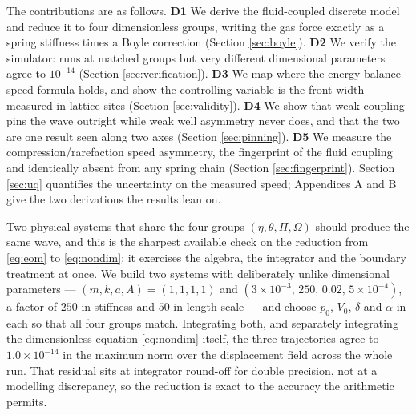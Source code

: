 The contributions are as follows. \textbf{D1} We derive the fluid-coupled discrete
model and reduce it to four dimensionless groups, writing the gas force exactly as
a spring stiffness times a Boyle correction (Section \ref{sec:boyle}).
\textbf{D2} We verify the simulator: runs at matched groups but very different
dimensional parameters agree to $10^{-14}$ (Section \ref{sec:verification}).
\textbf{D3} We map where the energy-balance speed formula holds, and show the
controlling variable is the front width measured in lattice sites (Section
\ref{sec:validity}). \textbf{D4} We show that weak coupling pins the wave outright
while weak well asymmetry never does, and that the two are one result seen along
two axes (Section \ref{sec:pinning}). \textbf{D5} We measure the
compression/rarefaction speed asymmetry, the fingerprint of the fluid coupling and
identically absent from any spring chain (Section \ref{sec:fingerprint}). Section
\ref{sec:uq} quantifies the uncertainty on the measured speed; Appendices A and B
give the two derivations the results lean on.



Two physical systems that share the four groups $(\eta,\theta,\Pi,\Omega)$ should
produce the same wave, and this is the sharpest available check on the reduction
from \eqref{eq:eom} to \eqref{eq:nondim}: it exercises the algebra, the
integrator and the boundary treatment at once. We build two systems with
deliberately unlike dimensional parameters --- $(m,k,a,A) = (1, 1, 1, 1)$ and
$(3\times10^{-3},\, 250,\, 0.02,\, 5\times10^{-4})$, a factor of $250$ in
stiffness and $50$ in length scale --- and choose $p_0$, $V_0$, $\delta$ and
$\alpha$ in each so that all four groups match. Integrating both, and separately
integrating the dimensionless equation \eqref{eq:nondim} itself, the three
trajectories agree to $1.0\times10^{-14}$ in the maximum norm over the displacement
field across the whole run. That residual sits at integrator round-off for double
precision, not at a modelling discrepancy, so the reduction is exact to the
accuracy the arithmetic permits.

